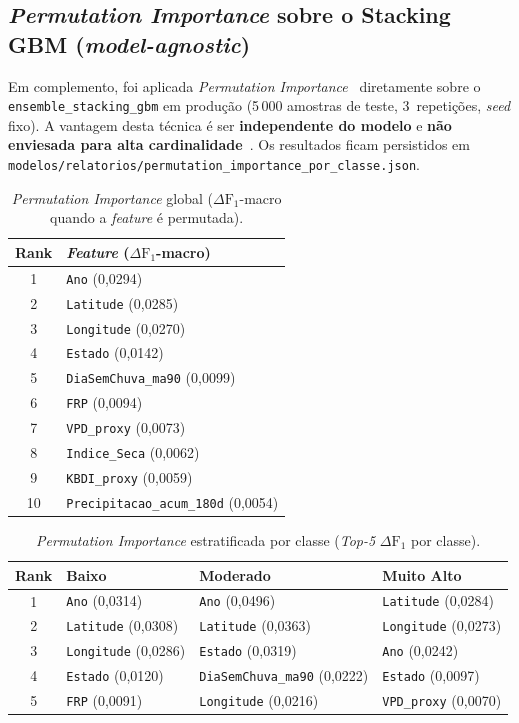 \subsection{\emph{Permutation Importance} sobre o Stacking GBM (\emph{model-agnostic})}

Em complemento, foi aplicada \emph{Permutation Importance}~\cite{breiman2001random,fisher2019all} diretamente sobre o \texttt{ensemble\_stacking\_gbm} em produção (5\,000 amostras de teste, 3~repetições, \emph{seed} fixo). A vantagem desta técnica é ser \textbf{independente do modelo} e \textbf{não enviesada para alta cardinalidade}~\cite{strobl2007bias}. Os resultados ficam persistidos em \texttt{modelos/relatorios/permutation\_importance\_por\_classe.json}.

\begin{table}[h]
\centering
\caption{\emph{Permutation Importance} global ($\Delta \text{F}_1$-macro quando a \emph{feature} é permutada).}
\label{tab:res_perm_global}
\begin{tabular}{cl}
\toprule
\textbf{Rank} & \textbf{\emph{Feature} ($\Delta \text{F}_1$-macro)} \\
\midrule
1 & \texttt{Ano} (0,0294) \\
2 & \texttt{Latitude} (0,0285) \\
3 & \texttt{Longitude} (0,0270) \\
4 & \texttt{Estado} (0,0142) \\
5 & \texttt{DiaSemChuva\_ma90} (0,0099) \\
6 & \texttt{FRP} (0,0094) \\
7 & \texttt{VPD\_proxy} (0,0073) \\
8 & \texttt{Indice\_Seca} (0,0062) \\
9 & \texttt{KBDI\_proxy} (0,0059) \\
10 & \texttt{Precipitacao\_acum\_180d} (0,0054) \\
\bottomrule
\end{tabular}
\end{table}

\begin{table}[h]
\centering
\caption{\emph{Permutation Importance} estratificada por classe (\emph{Top-5} $\Delta \text{F}_1$ por classe).}
\label{tab:res_perm_por_classe}
\footnotesize
\begin{tabular}{clll}
\toprule
\textbf{Rank} & \textbf{Baixo} & \textbf{Moderado} & \textbf{Muito Alto} \\
\midrule
1 & \texttt{Ano} (0,0314) & \texttt{Ano} (0,0496) & \texttt{Latitude} (0,0284) \\
2 & \texttt{Latitude} (0,0308) & \texttt{Latitude} (0,0363) & \texttt{Longitude} (0,0273) \\
3 & \texttt{Longitude} (0,0286) & \texttt{Estado} (0,0319) & \texttt{Ano} (0,0242) \\
4 & \texttt{Estado} (0,0120) & \texttt{DiaSemChuva\_ma90} (0,0222) & \texttt{Estado} (0,0097) \\
5 & \texttt{FRP} (0,0091) & \texttt{Longitude} (0,0216) & \texttt{VPD\_proxy} (0,0070) \\
\bottomrule
\end{tabular}
\end{table}

